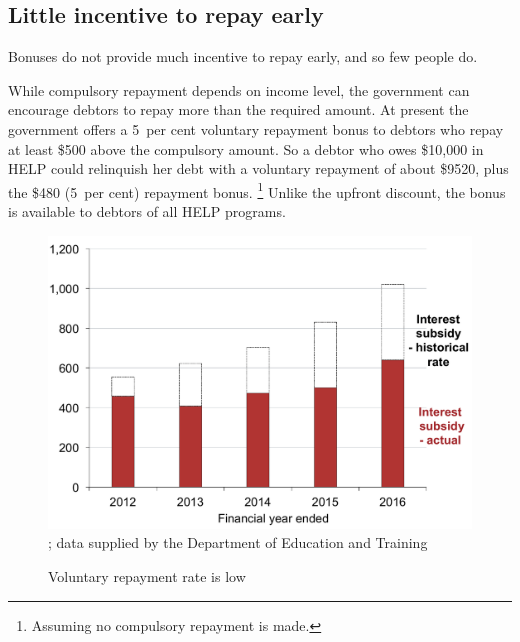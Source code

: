 \documentclass[embargoed]{grattan}
\begin{document}
\subsection{Little incentive to repay early}\label{little-incentive-to-repay-early}

Bonuses do not provide much incentive to repay early, and so few people do.

While compulsory repayment depends on income level, the government can encourage debtors to repay more than the required amount.
At present the government offers a 5~per cent voluntary repayment bonus to debtors who repay at least \$500 above the compulsory amount.
So a debtor who owes \$10,000 in \gls{HELP} could relinquish her debt with a voluntary repayment of about \$9520, plus the \$480 (5~per cent) repayment bonus.%
\footnote{Assuming no compulsory repayment is made.} 
Unlike the upfront discount, the bonus is available to debtors of all \gls{HELP} programs.

\begin{figure}
\caption{Voluntary repayment rate is low}\label{fig:fig8-voluntary-repayment-rate-is-low}

\includegraphics[page=8]{atlas/Chartpack.pdf}
{\textcites{Jackson2003TheHigherEducationContributionScheme}{Education2015Highereducationreport}; data supplied by the Department of Education and Training}
\end{figure}
\end{document}
